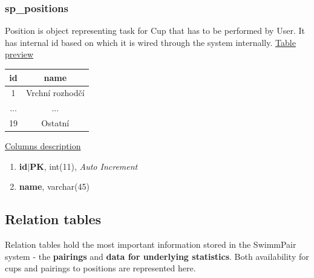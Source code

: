 \subsubsection*{sp\_positions}
Position is object representing task for Cup that has to be performed by User. It has internal id based on which it is wired through the system internally.
\newline
\underline{Table preview}
\begin{center}
 \begin{tabular}{||c c||} 
 \hline
 id & name  \\ [0.5ex] 
 \hline\hline
 1 & Vrchní rozhodčí \\ 
 \hline
 ... & ...  \\ [0.5ex]
\hline
 19 & Ostatní  \\
 \hline
\end{tabular}
\end{center}
\underline{Columns description}
\begin{enumerate}
  \setlength\itemsep{0em}
  \item \textbf{id$|$PK}, int(11), \textit{Auto Increment}
  \item \textbf{name}, varchar(45)
\end{enumerate}

\subsection{Relation tables}
Relation tables hold the most important information stored in the SwimmPair system - the \textbf{pairings} and \textbf{data for underlying statistics}. Both availability for cups and pairings to positions are represented here.
